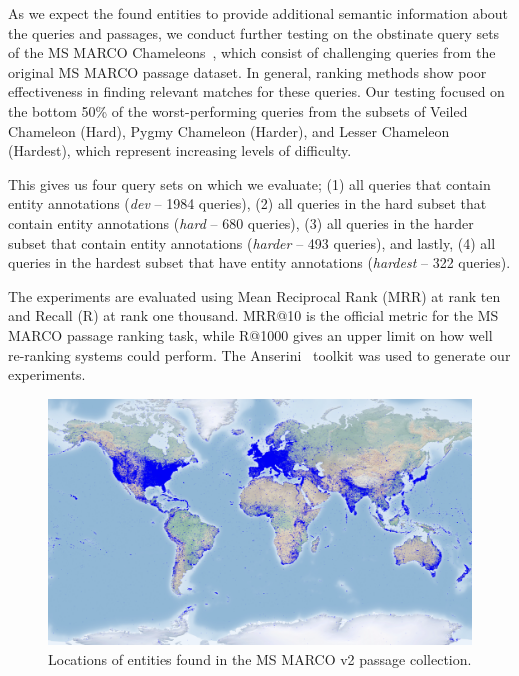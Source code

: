 As we expect the found entities to provide additional semantic information about the queries and passages, we conduct further testing on the obstinate query sets of the MS MARCO Chameleons~\citep{chameleons}, which consist of challenging queries from the original MS MARCO passage dataset. In general, ranking methods show poor effectiveness in finding relevant matches for these queries. Our testing focused on the bottom 50\% of the worst-performing queries from the subsets of Veiled Chameleon (Hard), Pygmy Chameleon (Harder), and Lesser Chameleon (Hardest), which represent increasing levels of difficulty. 

This gives us four query sets on which we evaluate; (1) all queries that contain entity annotations (\emph{dev} -- 1984 queries), (2) all queries in the hard subset that contain entity annotations (\emph{hard} -- 680 queries), (3) all queries in the harder subset that contain entity annotations (\emph{harder} -- 493 queries), and lastly, (4) all queries in the hardest subset that have entity annotations (\emph{hardest} -- 322 queries).

The experiments are evaluated using Mean Reciprocal Rank (MRR) at rank ten and Recall (R) at rank one thousand. MRR@10 is the official metric for the MS MARCO passage ranking task, while R@1000 gives an upper limit on how well re-ranking systems could perform. The Anserini~\citep{10.1145/3239571} toolkit was used to generate our experiments. 

\begin{figure}[!t]
	\centering
	\includegraphics[width=.9\textwidth]{imgs/basemap_shaded_blue_opa.png}
	\caption{Locations of entities found in the MS MARCO v2 passage collection.}
	\label{fig:entity_map}
\end{figure}

